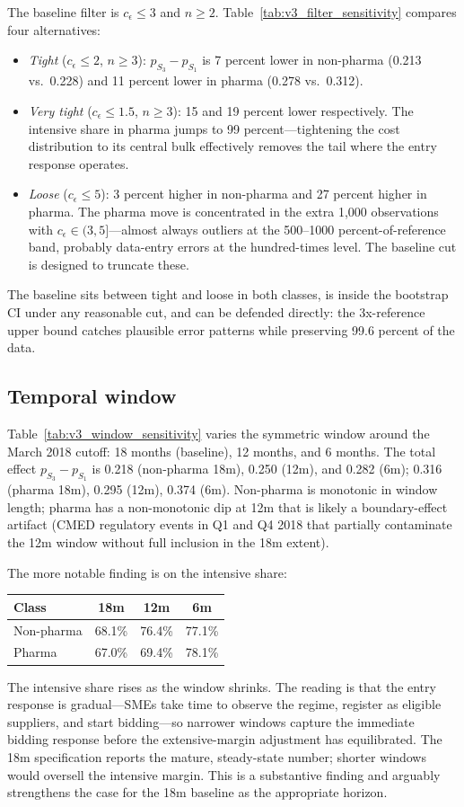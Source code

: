 The baseline filter is $c_\epsilon \le 3$ and $n \ge 2$. Table~\ref{tab:v3_filter_sensitivity} compares four alternatives:
\begin{itemize}
\item \emph{Tight} ($c_\epsilon \le 2$, $n \ge 3$): $p_{S_3} - p_{S_1}$ is 7 percent lower in non-pharma (0.213 vs.\ 0.228) and 11 percent lower in pharma (0.278 vs.\ 0.312).
\item \emph{Very tight} ($c_\epsilon \le 1.5$, $n \ge 3$): 15 and 19 percent lower respectively. The intensive share in pharma jumps to 99 percent---tightening the cost distribution to its central bulk effectively removes the tail where the entry response operates.
\item \emph{Loose} ($c_\epsilon \le 5$): 3 percent higher in non-pharma and 27 percent higher in pharma. The pharma move is concentrated in the extra 1{,}000 observations with $c_\epsilon \in (3, 5]$---almost always outliers at the 500--1000 percent-of-reference band, probably data-entry errors at the hundred-times level. The baseline cut is designed to truncate these.
\end{itemize}
The baseline sits between tight and loose in both classes, is inside the bootstrap CI under any reasonable cut, and can be defended directly: the 3x-reference upper bound catches plausible error patterns while preserving 99.6 percent of the data.

\subsection{Temporal window}

Table~\ref{tab:v3_window_sensitivity} varies the symmetric window around the March 2018 cutoff: 18 months (baseline), 12 months, and 6 months. The total effect $p_{S_3} - p_{S_1}$ is 0.218 (non-pharma 18m), 0.250 (12m), and 0.282 (6m); 0.316 (pharma 18m), 0.295 (12m), 0.374 (6m). Non-pharma is monotonic in window length; pharma has a non-monotonic dip at 12m that is likely a boundary-effect artifact (CMED regulatory events in Q1 and Q4 2018 that partially contaminate the 12m window without full inclusion in the 18m extent).

The more notable finding is on the intensive share:
\begin{center}
\begin{tabular}{lccc}
\toprule
Class      & 18m    & 12m    & 6m \\
\midrule
Non-pharma & 68.1\% & 76.4\% & 77.1\% \\
Pharma     & 67.0\% & 69.4\% & 78.1\% \\
\bottomrule
\end{tabular}
\end{center}
The intensive share rises as the window shrinks. The reading is that the entry response is gradual---SMEs take time to observe the regime, register as eligible suppliers, and start bidding---so narrower windows capture the immediate bidding response before the extensive-margin adjustment has equilibrated. The 18m specification reports the mature, steady-state number; shorter windows would oversell the intensive margin. This is a substantive finding and arguably strengthens the case for the 18m baseline as the appropriate horizon.

